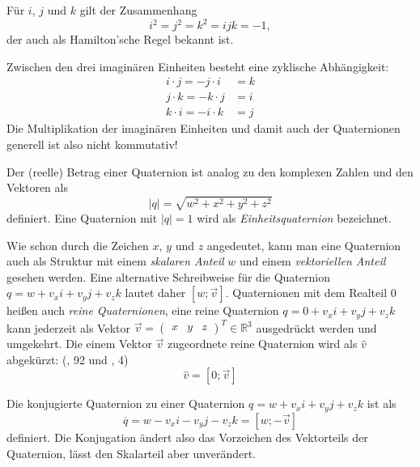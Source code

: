 Für $i$, $j$ und $k$ gilt der Zusammenhang
\begin{equation}
 i^2 = j^2 = k^2 = ijk = -1,
\end{equation} 
der auch als Hamilton'sche Regel bekannt ist.

Zwischen den drei imaginären Einheiten besteht eine zyklische Abhängigkeit:
\begin{align}
 i \cdot j = -j \cdot i &= k \\
 j \cdot k = -k \cdot j &= i \\
 k \cdot i = -i \cdot k &= j
\end{align}
Die Multiplikation der imaginären Einheiten und damit auch der Quaternionen generell ist also nicht kommutativ!

Der (reelle) Betrag einer Quaternion ist analog zu den komplexen Zahlen und den Vektoren als 
\begin{equation}
 \left| q \right| = \sqrt{w^2 + x^2 + y^2 + z^2}
\end{equation}
definiert. Eine Quaternion mit $\left| q \right| = 1$ wird als \emph{Einheitsquaternion} bezeichnet.

Wie schon durch die Zeichen $x$, $y$ und $z$ angedeutet, kann man eine Quaternion auch als Struktur mit einem \emph{skalaren Anteil} $w$ und einem \emph{vektoriellen Anteil}  gesehen werden. Eine alternative Schreibweise für die Quaternion $q = w + v_{x}i + v_{y}j + v_{z}k$ lautet daher $\left[w; \vec v \right]$. Quaternionen mit dem Realteil $0$ heißen auch \emph{reine Quaternionen}, eine reine Quaternion $q = 0 + v_{x}i + v_{y}j + v_{z}k$ kann jederzeit als Vektor $ \vec v = \begin{pmatrix} x & y & z \end{pmatrix}^T \in \mathbb R^3$ ausgedrückt werden und umgekehrt. Die einem Vektor $\vec v$ zugeordnete reine Quaternion wird als $\hat{v}$ abgekürzt: (\vgl \citep{script:spain}, 92 und \citep{rotationissues}, 4)
\begin{equation}
 \hat{v} = \left[ 0; \vec v \right]
\end{equation} 

Die konjugierte Quaternion zu einer Quaternion $q = w + v_{x}i + v_{y}j + v_{z}k$ ist als
\begin{equation}
 \overline{q} = w - v_{x}i - v_{y}j - v_{z}k = \left[ w; -\vec v \right]
\end{equation}
definiert. Die Konjugation ändert also das Vorzeichen des Vektorteils der Quaternion, lässt den Skalarteil aber unverändert.


